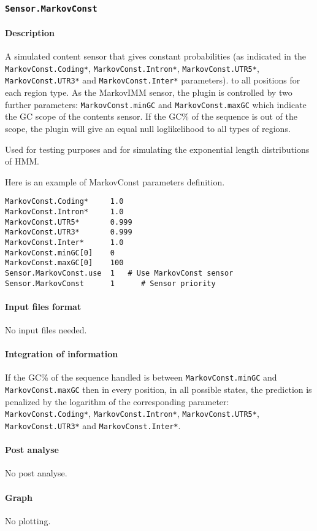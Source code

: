 
\subsubsection{\texttt{Sensor.MarkovConst}}

\paragraph{Description}

A simulated content sensor that gives constant probabilities (as
indicated in the \texttt{MarkovConst\-.Coding*},
\texttt{MarkovConst.Intron*}, \texttt{MarkovConst.UTR5*},
\texttt{MarkovConst.UTR3*} and \texttt{Markov\-Const.Inter*} parameters).
to all positions for each region type. As the MarkovIMM sensor, the
plugin is controlled by two further parameters:
\texttt{MarkovConst.minGC} and \texttt{MarkovConst.maxGC} which
indicate the GC scope of the contents sensor. If the GC\% of the
sequence is out of the scope, the plugin will give an equal null
loglikelihood to all types of regions.

Used for testing purposes and for simulating the exponential length
distributions of HMM.

Here is an example of MarkovConst parameters definition.
\begin{Verbatim}[fontsize=\small]
MarkovConst.Coding*     1.0
MarkovConst.Intron*     1.0
MarkovConst.UTR5*       0.999
MarkovConst.UTR3*       0.999
MarkovConst.Inter*      1.0
MarkovConst.minGC[0]    0
MarkovConst.maxGC[0]    100
Sensor.MarkovConst.use  1   # Use MarkovConst sensor
Sensor.MarkovConst      1      # Sensor priority
\end{Verbatim}

\paragraph{Input files format}

No input files  needed.

\paragraph{Integration of information}

If the GC\% of the sequence handled is between
\texttt{MarkovConst.minGC} and \texttt{MarkovConst.maxGC} then in
every position, in all possible states, the prediction is penalized by
the logarithm of the corresponding parameter:
\texttt{MarkovConst.Coding*}, \texttt{MarkovConst.Intron*},
\texttt{MarkovConst.UTR5*}, \texttt{MarkovConst.UTR3*} and
\texttt{MarkovConst.Inter*}.

\paragraph{Post analyse}

No post analyse.

\paragraph{Graph}

No plotting.

